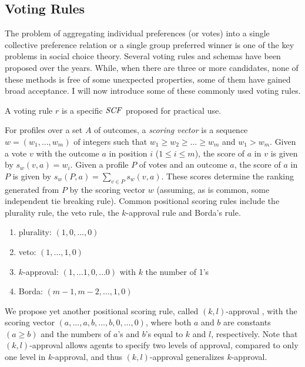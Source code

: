 \subsection{Voting Rules}
The problem of aggregating individual preferences (or votes) into a single
collective preference relation or a single group preferred winner is
one of the key problems in social choice theory.
Several voting rules and schemas have been proposed over the years.
While, when there are three or more candidates, none of these
methods is free of some unexpected properties,
some of them have gained broad acceptance.
I will now introduce some of these commonly used voting rules.

\begin{definition}
	A voting rule $r$ is a specific $\it{SCF}$ proposed for practical use.
\end{definition}

For profiles over a set $A$ of outcomes, 
a \emph{scoring vector} is a sequence $w= (w_1,\ldots,
w_m)$ of integers such that $w_1\geq w_2 \geq \ldots \geq w_m$
and $w_1 > w_m$. Given a vote
$v$ with the outcome $a$ in position $i$ ($1 \leq i \leq m$), 
the score of $a$ in
$v$ is given
by $s_w(v,a)=w_i$. Given a profile $P$ of votes and an outcome $a$,
the score of $a$ in $P$ is given by $s_w(P,a) = \sum_{v\in P} s_w(v,a)$. 
These scores determine the ranking generated from $P$ by the scoring
vector $w$ (assuming, as is common, some independent tie breaking rule). 
Common positional scoring rules include the plurality rule,
the veto rule, the $k$-approval rule and Borda's rule.
\begin{enumerate} \itemsep -4pt
	\item plurality: $(1,0,\ldots,0)$
	\item veto: $(1,\ldots,1,0)$
	\item $k$-approval: $(1,\ldots 1,0,\ldots 0)$ with $k$ the number of 1's
	\item Borda: $(m-1,m-2,\ldots, 1,0)$
\end{enumerate}

We propose yet another positional scoring rule, called $(k,l)$-approval \cite{LiuT},
with the scoring vector $(a,\ldots,a,b,\ldots,b,0,\ldots,0)$, where
both $a$ and $b$ are constants $(a \geq b)$ and the numbers of $a$'s and $b$'s equal to
$k$ and $l$, respectively.
Note that $(k,l)$-approval allows agents to specify two levels of approval,
compared to only one level in $k$-approval, and thus $(k,l)$-approval
generalizes $k$-approval.

